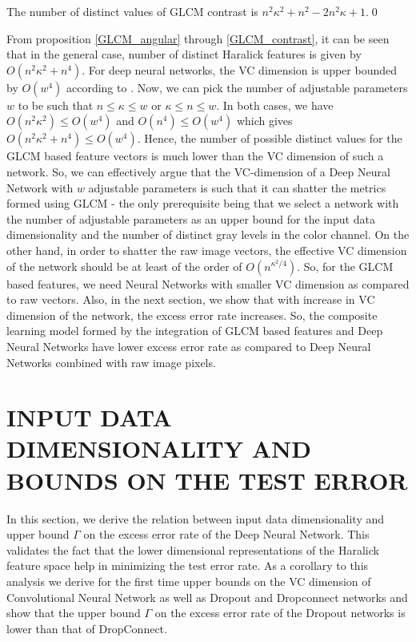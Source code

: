 \documentclass[11pt,a4paper]{article}
\begin{document}
\begin{proposition}\label{GLCM_contrast}
The number of distinct values of GLCM contrast is $n^2\kappa^2+n^2-2n^2\kappa+1$.\qed
\end{proposition}

From proposition \ref{GLCM_angular} through \ref{GLCM_contrast}, it can be seen that in the general case, number of distinct Haralick features is given by $O(n^2\kappa^2 + n^4)$. For deep neural networks, the VC dimension is upper bounded by $O(w^{4})$ according to \cite{Bartlett_vapnik-chervonenkisdimension}.
Now, we can pick the number of adjustable parameters $w$ to be such that $n{\leq}\kappa{\leq}w$ or $\kappa{\leq}n{\leq}w$. In both cases, we have $O(n^2\kappa^2){\leq}O(w^4)$ and $O(n^4){\leq}O(w^4)$ which gives $O(n^2\kappa^2+n^4){\leq}O(w^4)$.
Hence, the number of possible distinct values for the GLCM based feature vectors is much lower than the VC dimension of such a network. So, we can effectively argue that the VC-dimension of a Deep Neural Network with $w$ adjustable parameters is such that it can shatter the metrics formed using GLCM - the only prerequisite being that we select a network with the number of adjustable parameters as an upper bound for the input data dimensionality and the number of distinct gray levels in the color channel. On the other hand, in order to shatter the raw image vectors, the effective VC dimension of the network should be at least of the order of $O({n^{\kappa^2/4}})$. So, for the GLCM based features, we need Neural Networks with smaller VC dimension as compared to raw vectors. Also, in the next section, we show that with increase in VC dimension of the network, the excess error rate increases. So, the composite learning model formed by the integration of GLCM based features and Deep Neural Networks have lower excess error rate as compared to Deep Neural Networks combined with raw image pixels. 

\section{INPUT DATA DIMENSIONALITY AND \\ BOUNDS ON THE TEST ERROR} 

In this section, we derive the relation between input data dimensionality and upper bound $\Gamma$ on the excess error rate of the Deep Neural Network. This validates the fact that the lower dimensional representations of the Haralick feature space help in minimizing the test error rate. As a corollary to this analysis we derive for the first time upper bounds on the VC dimension of Convolutional Neural Network as well as Dropout and Dropconnect networks and show that the upper bound $\Gamma$ on the excess error rate of the Dropout networks is lower than that of DropConnect.  
\end{document}
